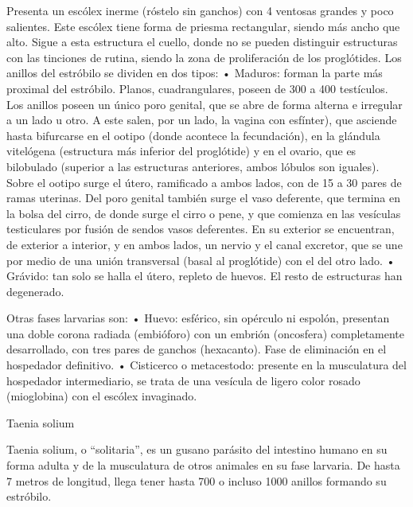 Presenta un escólex inerme (róstelo sin ganchos) con 4 ventosas grandes y poco salientes. Este escólex tiene forma de priesma rectangular, siendo más ancho que alto. Sigue a esta estructura el cuello, donde no se pueden distinguir estructuras con las tinciones de rutina, siendo la zona de proliferación de los proglótides. Los anillos del estróbilo se dividen en dos tipos:
• Maduros: forman la parte más proximal del estróbilo. Planos, cuadrangulares, poseen de 300 a 400 testículos. Los anillos poseen un único poro genital, que se abre de forma alterna e irregular a un lado u otro. A este salen, por un lado, la vagina con esfínter), que asciende hasta bifurcarse en el ootipo (donde acontece la fecundación), en la glándula vitelógena (estructura más inferior del proglótide) y en el ovario, que es bilobulado (superior a las estructuras anteriores, ambos lóbulos son iguales). Sobre el ootipo surge el útero, ramificado a ambos lados, con de 15 a 30 pares de ramas uterinas. Del poro genital también surge el vaso deferente, que termina en la bolsa del cirro, de donde surge el cirro o pene, y que comienza en las vesículas testiculares por fusión de sendos vasos deferentes. En su exterior se encuentran, de exterior a interior, y en ambos lados, un nervio y el canal excretor, que se une por medio de una unión transversal (basal al proglótide) con el del otro lado.
• Grávido: tan solo se halla el útero, repleto de huevos. El resto de estructuras han degenerado.

Otras fases larvarias son:
• Huevo: esférico, sin opérculo ni espolón, presentan una doble corona radiada (embióforo) con un embrión (oncosfera) completamente desarrollado, con tres pares de ganchos (hexacanto). Fase de eliminación en el hospedador definitivo.
• Cisticerco o metacestodo: presente en la musculatura del hospedador intermediario, se trata de una vesícula de ligero color rosado (mioglobina) con el escólex invaginado.

Taenia solium

Taenia solium, o “solitaria”, es un gusano parásito del intestino humano en su forma adulta y de la musculatura de otros animales en su fase larvaria. De hasta 7 metros de longitud, llega tener hasta 700 o incluso 1000 anillos formando su estróbilo. 

